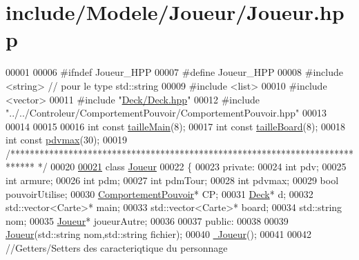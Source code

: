 \hypertarget{_joueur_8hpp_source}{\section{include/\-Modele/\-Joueur/\-Joueur.hpp}
}

\begin{DoxyCode}
00001 
00006 \textcolor{preprocessor}{#ifndef Joueur\_HPP}
00007 \textcolor{preprocessor}{}\textcolor{preprocessor}{#define Joueur\_HPP}
00008 \textcolor{preprocessor}{}\textcolor{preprocessor}{#include <string>} \textcolor{comment}{// pour le type std::string}
00009 \textcolor{preprocessor}{#include <list>}
00010 \textcolor{preprocessor}{#include <vector>}
00011 \textcolor{preprocessor}{#include "\hyperlink{_deck_8hpp}{Deck/Deck.hpp}"}
00012 \textcolor{preprocessor}{#include "../../Controleur/ComportementPouvoir/ComportementPouvoir.hpp"}
00013 
00014 
00015 
00016 \textcolor{keywordtype}{int} \textcolor{keyword}{const} \hyperlink{_joueur_8hpp_a24b143833a7db405c683c8bc59ca0fac}{tailleMain}(8);
00017 \textcolor{keywordtype}{int} \textcolor{keyword}{const} \hyperlink{_joueur_8hpp_a6f4783901344daaa0b0bb110a606b04b}{tailleBoard}(8);
00018 \textcolor{keywordtype}{int} \textcolor{keyword}{const} \hyperlink{_joueur_8hpp_ad3b4d63b09df961ebeb29919db73894a}{pdvmax}(30);
00019 \textcolor{comment}{/*****************************************************************************
      */}
00020 
\hypertarget{_joueur_8hpp_source_l00021}{}\hyperlink{class_joueur}{00021} \textcolor{keyword}{class }\hyperlink{class_joueur}{Joueur}
00022 \{
00023     \textcolor{keyword}{private}:
00024         \textcolor{keywordtype}{int} pdv;
00025             \textcolor{keywordtype}{int} armure;
00026             \textcolor{keywordtype}{int} pdm;
00027             \textcolor{keywordtype}{int} pdmTour;
00028         \textcolor{keywordtype}{int} pdvmax;
00029         \textcolor{keywordtype}{bool} pouvoirUtilise;
00030         \hyperlink{class_comportement_pouvoir}{ComportementPouvoir}* CP;
00031         \hyperlink{class_deck}{Deck}* d;
00032         std::vector<Carte>* main;
00033         std::vector<Carte>* board;
00034         std::string nom;
00035         \hyperlink{class_joueur}{Joueur}* joueurAutre;
00036     
00037     \textcolor{keyword}{public}:
00038         
00039         \hyperlink{class_joueur_a055a0bc38f47a424243d44e7078af129}{Joueur}(std::string nom,std::string fichier);
00040         \hyperlink{class_joueur_a9fb594f755601ee77ce5884c4c0861f3}{~Joueur}();
00041         
00042         \textcolor{comment}{//Getters/Setters des caracteriqtique du personnage}

\end{DoxyCode}
